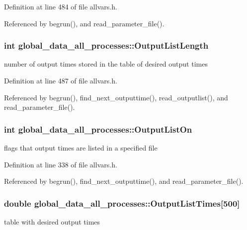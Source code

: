 Definition at line 484 of file allvars.h.



Referenced by begrun(), and read\_\-parameter\_\-file().

\hypertarget{structglobal__data__all__processes_af0ada535a17b75233e0e0de6ff8fa448}{
\subsubsection[{OutputListLength}]{\setlength{\rightskip}{0pt plus 5cm}int {\bf global\_\-data\_\-all\_\-processes::OutputListLength}}}
\label{structglobal__data__all__processes_af0ada535a17b75233e0e0de6ff8fa448}
number of output times stored in the table of desired output times 

Definition at line 487 of file allvars.h.



Referenced by begrun(), find\_\-next\_\-outputtime(), read\_\-outputlist(), and read\_\-parameter\_\-file().

\hypertarget{structglobal__data__all__processes_a4e9d69a3dd88c6aef6f4afd640243950}{
\subsubsection[{OutputListOn}]{\setlength{\rightskip}{0pt plus 5cm}int {\bf global\_\-data\_\-all\_\-processes::OutputListOn}}}
\label{structglobal__data__all__processes_a4e9d69a3dd88c6aef6f4afd640243950}
flags that output times are listed in a specified file 

Definition at line 338 of file allvars.h.



Referenced by begrun(), find\_\-next\_\-outputtime(), and read\_\-parameter\_\-file().

\hypertarget{structglobal__data__all__processes_a7f3307450336a806e545661ba6c79ba5}{
\subsubsection[{OutputListTimes}]{\setlength{\rightskip}{0pt plus 5cm}double {\bf global\_\-data\_\-all\_\-processes::OutputListTimes}\mbox{[}500\mbox{]}}}
\label{structglobal__data__all__processes_a7f3307450336a806e545661ba6c79ba5}
table with desired output times 

